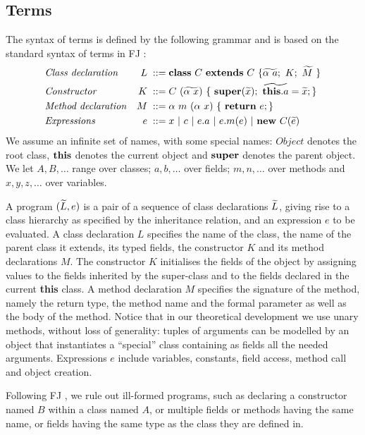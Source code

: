\subsection{Terms}
\label{sec:terms}
The syntax of terms is defined by the following grammar and is based on the standard syntax of terms in FJ \cite{featherweight}:
\begin{align*}
     & \mbox{\textit{Class declaration}}  & L \; ::= \; & \syndecl{C}{C}{\wt{\alpha \ a};\ K; \ \wt{M}\ }                         \\
     & \mbox{\textit{Constructor}}        & K \;::=\;   & C\ (\wt{\alpha\ x})\ \{\ \synsuper(\wt{x});\ \wt{\synthis.a}=\wt{x}; \} \\
     & \mbox{\textit{Method declaration}} & M \; ::= \; & \alpha \ m\ (\alpha \ x)\ \{\ \synret e; \}                             \\
     & \mbox{\textit{Expressions}}        & e \; ::=\;  & x\ |\  c\ |\ e.a\ |\ e.m(e) \ | \ \synnew C(\wt{e})
\end{align*}
We assume an infinite set of names, with some special names:
$\mathit{Object}$ denotes the root class, $\mathbf{this}$ denotes the current object and $\mathbf{super}$ denotes the parent object.
We let  $A, B,\ldots$ range over classes; $a, b,\ldots$ over fields; $m, n,\ldots$ over methods and $x, y, z, \ldots$ over variables.

A {program} $(\widetilde{L}, e)$ is a pair of a sequence of class declarations $\widetilde{L}$, giving rise to a class hierarchy as specified by the inheritance relation, and an expression $e$ to be evaluated.
%
A class declaration $L$ specifies the name of the class, the name of the parent class it extends, its typed fields, the constructor $K$ and its method declarations $M$.
The constructor $K$ initialises the fields of the object by assigning values to the fields inherited by the super-class and to the fields declared in the current \textbf{this} class.
%
A method declaration $M$ specifies the signature of the method, namely the return type, the method name and the formal parameter as well as the body of the method.
Notice that in our theoretical development we use unary methods, without loss of generality: tuples of arguments can be modelled by an object that instantiates a ``special'' class containing as fields all the needed arguments.
Expressions $e$ include variables, constants, field access, method call and object creation.



Following FJ \cite{featherweight}, we rule out ill-formed programs, such as declaring a constructor named $B$ within a class named $A$, or multiple fields or methods having the same name, or fields having the same type as the class they are defined in.

